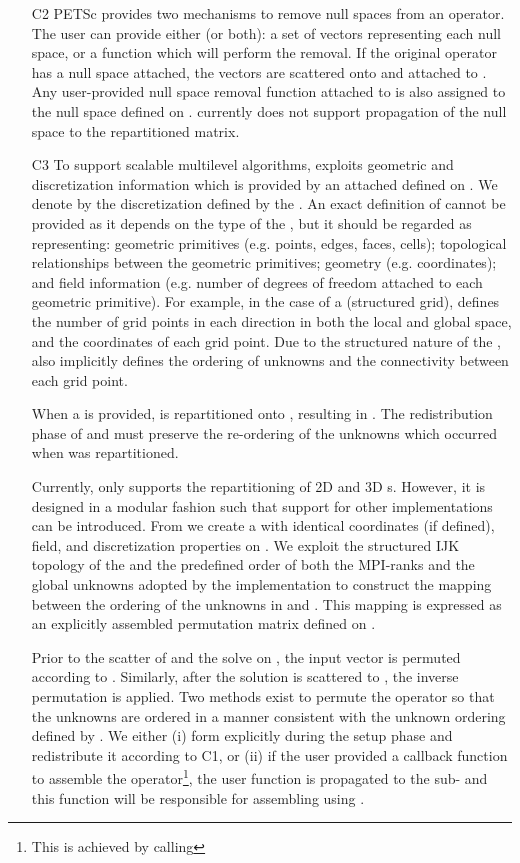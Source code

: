 \documentclass[]{siamart0216}
\begin{document}
\begin{itemize}
\item[C2] PETSc provides two mechanisms to remove null spaces from an operator.
	The user can provide either (or both): 
	  a set of  vectors  representing each null space, or
	  a function which will perform the removal.
	If the original operator  has a null space attached, the vectors  are scattered onto 
	and attached to . Any user-provided null space removal function attached to  
	is also assigned to the null space defined on . 
	 currently does not support propagation of the null space to the repartitioned matrix.
\item[C3] To support scalable multilevel algorithms,  exploits geometric 
	and discretization information which is provided by an attached  defined on . 
We denote by  the discretization defined by the .
	An exact definition of  cannot be provided as it depends on the type of the , 
	but it should be regarded as representing: geometric primitives (e.g. points, edges, faces, cells);
	topological relationships between the geometric primitives; 
	geometry (e.g. coordinates); and field information (e.g. number of degrees of freedom attached to each geometric primitive).
	For example, in the case of a  (structured grid),  defines the number of grid 
	points in each  direction in both the local and global space, and the coordinates of each grid point. 
	Due to the  structured nature of the ,  also implicitly defines the ordering of unknowns and the 
	connectivity between each grid point.
	
	When a  is provided,  is repartitioned onto , resulting in . 
	The redistribution phase of  and  must preserve the re-ordering of the unknowns which occurred 
	when  was repartitioned. 
	 	
	Currently,  only supports the repartitioning of 2D and 3D s. However, it is designed 
	in a modular fashion such that support for other  implementations can be introduced. 
	From  we create a  with identical coordinates (if defined), field, and 
	discretization properties on . 
	We exploit the structured IJK topology of the  and the predefined  order of 
	both the MPI-ranks and the global unknowns adopted by the  implementation to construct 
	the mapping between the ordering of the unknowns in  and . 
	This mapping is expressed as an explicitly assembled permutation matrix  defined on . 
	
	Prior to the scatter of  and the solve on , the input vector is permuted according to . 
	Similarly, after the solution  is scattered to , the inverse permutation  is applied.
	Two methods exist to permute the operator  so that the unknowns are ordered in a manner consistent with the  
	unknown ordering defined by . We either (i) form 
	 explicitly during the setup phase and redistribute it according to C1, 
	or (ii) if the user provided a callback function to assemble the operator\footnote{This is achieved by calling }, the user function is
	propagated to the sub- and this function will be responsible for assembling  using .	
	



\end{itemize}
\end{document}

